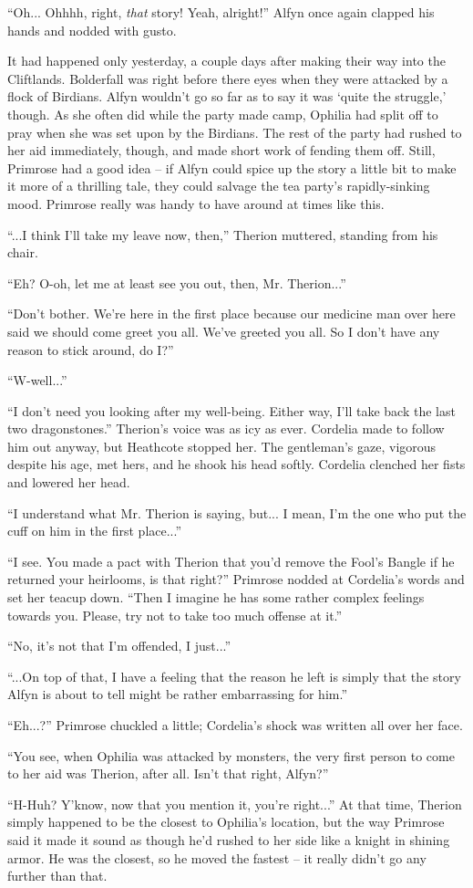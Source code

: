 ``Oh... Ohhhh, right, \emph{that} story! Yeah, alright!'' Alfyn once again clapped his hands and nodded with gusto.

It had happened only yesterday, a couple days after making their way into the Cliftlands. Bolderfall was right before there eyes when they were attacked by a flock of Birdians. Alfyn wouldn't go so far as to say it was `quite the struggle,' though. As she often did while the party made camp, Ophilia had split off to pray when she was set upon by the Birdians. The rest of the party had rushed to her aid immediately, though, and made short work of fending them off. Still, Primrose had a good idea -- if Alfyn could spice up the story a little bit to make it more of a thrilling tale, they could salvage the tea party's rapidly-sinking mood. Primrose really was handy to have around at times like this.

``...I think I'll take my leave now, then,'' Therion muttered, standing from his chair.

``Eh? O-oh, let me at least see you out, then, Mr. Therion...''

``Don't bother. We're here in the first place because our medicine man over here said we should come greet you all. We've greeted you all. So I don't have any reason to stick around, do I?''

``W-well...''

``I don't need you looking after my well-being. Either way, I'll take back the last two dragonstones.'' Therion's voice was as icy as ever. Cordelia made to follow him out anyway, but Heathcote stopped her. The gentleman's gaze, vigorous despite his age, met hers, and he shook his head softly. Cordelia clenched her fists and lowered her head. 

``I understand what Mr. Therion is saying, but... I mean, I'm the one who put the cuff on him in the first place...''

``I see. You made a pact with Therion that you'd remove the Fool's Bangle if he returned your heirlooms, is that right?'' Primrose nodded at Cordelia's words and set her teacup down. ``Then I imagine he has some rather complex feelings towards you. Please, try not to take too much offense at it.''

``No, it's not that I'm offended, I just...''

``...On top of that, I have a feeling that the reason he left is simply that the story Alfyn is about to tell might be rather embarrassing for him.''

``Eh...?'' Primrose chuckled a little; Cordelia's shock was written all over her face.

``You see, when Ophilia was attacked by monsters, the very first person to come to her aid was Therion, after all. Isn't that right, Alfyn?''

``H-Huh? Y'know, now that you mention it, you're right...'' At that time, Therion simply happened to be the closest to Ophilia's location, but the way Primrose said it made it sound as though he'd rushed to her side like a knight in shining armor. He was the closest, so he moved the fastest -- it really didn't go any further than that.
